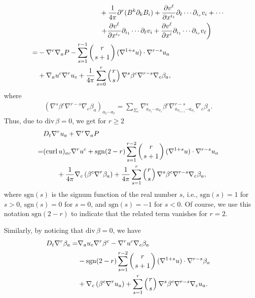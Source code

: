 \documentclass[12pt,reqno]{amsart}
\numberwithin{equation}{section}
\theoremstyle{definition}
\theoremstyle{remark}
\begin{document}
\begin{align*}
  &\qquad\qquad\qquad\quad\qquad +\frac{1}{4\pi}{\partial}^r(B^k{\partial}_k B_i)+\frac{{\partial} v^\ell}{{\partial} x^{i_1}}{\partial}_\ell\cdots {\partial}_{i_r} v_i+\cdots\\
  &\qquad\qquad\qquad\quad\qquad\left.+\frac{{\partial} v^\ell}{{\partial} x^{i_r}} {\partial}_{i_1}\cdots {\partial}_\ell v_i+\frac{{\partial} v^\ell}{{\partial} x^i}{\partial}_{i_1}\cdots {\partial}_{i_r}v_\ell\right)\\
  =&-{\nabla}^r{\nabla}_a{P } -\sum_{s=1}^{r-1}\left(r\atop s+1\right)({\nabla}^{1+s}u)\cdot {\nabla}^{r-s}u_a\\
  &+{\nabla}_a u^c{\nabla}^r u_c+\frac{1}{4\pi}\sum_{s=0}^r\left(r\atop s\right) {\nabla}^s\beta^c{\nabla}^{r-s}{\nabla}_c \beta_a,
\end{align*}
where
\begin{align}
  \left({\nabla}^s\beta^c{\nabla}^{r-s} {\nabla}_c\beta_a\right)_{a_1\cdots a_r}=\sum_{\Sigma_r}{\nabla}_{a_{\sigma_1}\cdots a_{\sigma_s}}^s \beta^c {\nabla}_{a_{\sigma_{s+1}}\cdots a_{\sigma_r}}^{r-s}{\nabla}_c\beta_a.
\end{align}
Thus, due to ${\mathrm{div}\,} \beta=0$, we get for $r{\geqslant} 2$
\begin{align}\label{eq.r.u}
  &D_t{\nabla}^r u_a+{\nabla}^r{\nabla}_a{P } {\nonumber}\\
  =&({\mathrm{curl}\,} u)_{ac}{\nabla}^r u^c+{\mathrm{sgn}}(2-r)\sum_{s=1}^{r-2}\left(r\atop s+1\right)({\nabla}^{1+s}u)\cdot {\nabla}^{r-s}u_a{\nonumber}\\
  &\qquad+\frac{1}{4\pi}{\nabla}_c\left(\beta^c{\nabla}^r\beta_a\right)+\frac{1}{4\pi}\sum_{s=1}^r\left(r\atop s\right) {\nabla}^s\beta^c{\nabla}^{r-s} {\nabla}_c\beta_a,
\end{align}
where ${\mathrm{sgn}}(s)$ is the signum function of the real number $s$, i.e., ${\mathrm{sgn}}(s)=1$ for $s>0$, ${\mathrm{sgn}}(s)=0$ for $s=0$, and ${\mathrm{sgn}}(s)=-1$ for $s<0$. Of course, we use this notation ${\mathrm{sgn}}(2-r)$ to indicate that the related term vanishes for $r=2$.

Similarly, by noticing that ${\mathrm{div}\,}\beta=0$, we have
\begin{align}\label{eq.nb.beta}
 D_t{\nabla}^r \beta_a=&{\nabla}_au_c{\nabla}^r\beta^c-{\nabla}^r u^c{\nabla}_c\beta_a{\nonumber}\\
 &-{\mathrm{sgn}}(2-r)\sum_{s=1}^{r-2}\left(r\atop s+1\right)({\nabla}^{1+s}u)\cdot {\nabla}^{r-s}\beta_a{\nonumber}\\
  &+{\nabla}_c\left(\beta^c{\nabla}^r u_a\right)+\sum_{s=1}^{r}\left(r\atop s\right) {\nabla}^s\beta^c{\nabla}^{r-s} {\nabla}_c u_a.
\end{align}
\end{document}
